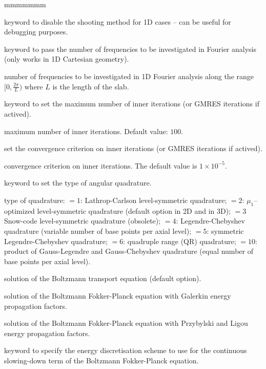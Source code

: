 \begin{ListeDeDescription}{mmmmmmm}
\item[\moc{NSHT}] keyword to disable the shooting method for 1D cases -- can be useful for debugging purposes.

\item[\moc{FOUR}] keyword to pass the number of frequencies to be investigated in Fourier analysis (only works in 1D Cartesian geometry).
\item[\dusa{nfou}] number of frequencies to be investigated in 1D Fourier analysis along the range $[0, \frac{2\pi}{L})$ where $L$ is the length of the slab.

\item[\moc{MAXI}] keyword to set the maximum number of inner iterations (or GMRES iterations if actived).
\item[\dusa{maxi}] maximum number of inner iterations. Default value: $100$.

\item[\moc{EPSI}] set the convergence criterion on inner iterations (or GMRES iterations if actived).
\item[\dusa{epsi}] convergence criterion on inner iterations. The default value is $1\times 10^{-5}$.
\item[\moc{QUAD}] keyword to set the type of angular quadrature.

\item[\dusa{iquad}] type of quadrature: $=1$: Lathrop-Carlson level-symmetric quadrature;
$=2$: $\mu_1$--optimi\-zed level-symmetric quadrature (default option in 2D and in 3D); $=3$ Snow-code level-symmetric quadrature
(obsolete); $=4$: Legendre-Chebyshev quadrature (variable number of base points
per axial level); $=5$: symmetric Legendre-Chebyshev quadrature; $=6$: quadruple range (QR)
quadrature;\cite{quadrupole} $=10$: product of Gauss-Legendre and Gauss-Chebyshev quadrature (equal
number of base points per axial level).

\item[\moc{BTE}] solution of the Boltzmann transport equation (default option).

\item[\moc{BFPG}] solution of the Boltzmann Fokker-Planck equation with Galerkin energy propagation factors.

\item[\moc{BFPL}] solution of the Boltzmann Fokker-Planck equation with Przybylski and Ligou energy propagation factors.\cite{ligou}

\item[\moc{ESCHM}] keyword to specify the energy discretisation scheme to use for the continuous slowing-down term of the Boltzmann Fokker-Planck equation. 


\end{ListeDeDescription}
